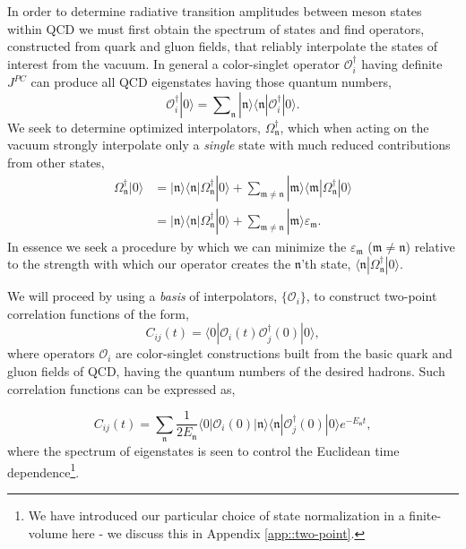 \documentclass[twocolumn,amsmath,amssymb,prd,10pt,floatfix, 
superscriptaddress,nofootinbib, showpacs, preprintnumbers]{revtex4-1}
\newcommand{\estate}[1]{\ensuremath{\mathfrak{#1}}}
\begin{document}
In order to determine radiative transition amplitudes between meson states within QCD we must first obtain the spectrum of states and find operators, constructed from quark and gluon fields, that reliably interpolate the states of interest from the vacuum. In general a color-singlet operator $\mathcal{O}_i^\dag$ having definite $J^{PC}$ can produce all QCD eigenstates having those quantum numbers,
\begin{equation}
	\mathcal{O}_i^\dag |0\rangle = \sum\nolimits_\mathfrak{n} |\mathfrak{n} \rangle \langle \mathfrak{n} | \mathcal{O}_i^\dag |0\rangle.  \nonumber
\end{equation}
We seek to determine optimized interpolators, $\Omega_\estate{n}^\dagger$, which when acting on the vacuum strongly interpolate only a \emph{single} state with much reduced contributions from other states,
\begin{align*}
\Omega_\estate{n}^\dagger | 0 \rangle &= |\estate{n}\rangle \langle \estate{n} | \Omega^\dagger_\estate{n} | 0 \rangle + \sum_{\estate{m} \neq \estate{n}}  |\estate{m}\rangle \langle \estate{m} | \Omega^\dagger_\estate{n} | 0 \rangle \\
&= |\estate{n}\rangle \langle \estate{n} | \Omega^\dagger_\estate{n} | 0 \rangle + \sum_{\estate{m} \neq \estate{n}}  |\estate{m}\rangle \varepsilon_\estate{m}.
\end{align*}
In essence we seek a procedure by which we can minimize the $\varepsilon_\estate{m}$ ($\estate{m} \neq \estate{n}$) relative to the strength with which our operator creates the $\estate{n}$'th state, $\langle \estate{n} | \Omega^\dagger_\estate{n} | 0 \rangle$. 

We will proceed by using a \emph{basis} of interpolators, $\{ \mathcal{O}_i \}$, to construct two-point correlation functions of the form, 
\begin{equation*}
C_{ij}(t) = \langle 0 | \mathcal{O}^{\,}_i(t) \mathcal{O}_j^\dagger(0) | 0 \rangle,
\end{equation*}
where operators $\mathcal{O}_i$ are color-singlet constructions built from the basic quark and gluon fields of QCD, having the quantum numbers of the desired hadrons. Such correlation functions can be expressed as, 

\begin{equation*}
C_{ij}(t) = \sum_\estate{n} \frac{1}{2E_\estate{n}} \langle 0 | \mathcal{O}_i(0) | \estate{n} \rangle \langle \estate{n} | \mathcal{O}_j^\dagger(0) | 0 \rangle e^{-E_\estate{n} t}, 
\end{equation*}
where the spectrum of eigenstates is seen to control the Euclidean time dependence\footnote{We have introduced our particular choice of state normalization in a finite-volume here - we discuss this in Appendix \ref{app::two-point}. }. 
\end{document}
